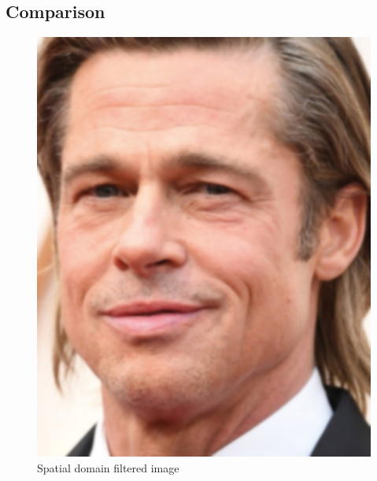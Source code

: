 \documentclass[a4paper]{article}
\begin{document}
\subsection{Comparison}
\noindent
\begin{minipage}{0.49\textwidth}
\begin{figure}[H]
    \centering
    \includegraphics[width=\textwidth]{../code/task2/output/1_spatial_domain.jpg}
    \caption{Spatial domain filtered image}
\end{figure}
\end{minipage}
\hfill
\end{document}
